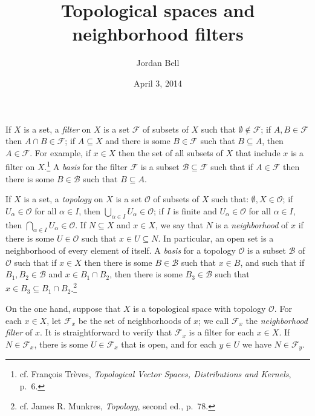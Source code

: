 \documentclass{article}
\begin{document}
\title{Topological spaces and neighborhood filters}
\author{Jordan Bell}
\date{April 3, 2014}
\maketitle

If $X$ is a set, a {\em filter} on $X$ is a set $\mathcal{F}$ of subsets of $X$ such that $\emptyset \not \in \mathcal{F}$; if $A,B \in \mathcal{F}$ then $A \cap B \in \mathcal{F}$;
if $A \subseteq X$ and there is some $B \in \mathcal{F}$ such that $B \subseteq A$, then $A \in \mathcal{F}$. For example, if $x \in X$ then the set of all subsets of $X$ that include
$x$ is a filter on $X$.\footnote{cf. Fran{\c c}ois Tr\`eves, {\em Topological Vector Spaces, Distributions and Kernels}, p.~6.}
A {\em basis} for the filter $\mathcal{F}$ is a subset $\mathcal{B} \subseteq \mathcal{F}$ such that if $A \in \mathcal{F}$ then there is some $B \in \mathcal{B}$ such that
$B \subseteq A$.


If $X$ is a set, a {\em topology} on $X$ is a set $\mathcal{O}$ of subsets of $X$ such that: $\emptyset, X \in \mathcal{O}$; 
if $U_\alpha \in \mathcal{O}$ for all $\alpha \in I$, then $\bigcup_{\alpha \in I} U_\alpha \in \mathcal{O}$; if $I$ is finite and
$U_\alpha \in \mathcal{O}$ for all $\alpha \in I$, then $\bigcap_{\alpha \in I} U_\alpha \in \mathcal{O}$. If $N \subseteq X$ and $x \in X$, we say that
$N$ is a {\em neighborhood} of $x$ if there is some $U \in \mathcal{O}$ such that $x \in U \subseteq N$. In particular, an open set is a neighborhood of every element of itself.
A {\em basis} for a topology $\mathcal{O}$ is a subset $\mathcal{B}$ of $\mathcal{O}$ such that if $x \in X$ then there is some $B \in \mathcal{B}$ such that $x \in B$, and such that
if $B_1,B_2 \in \mathcal{B}$ and $x \in B_1 \cap B_2$, then there is some $B_3 \in \mathcal{B}$ such that $x \in B_3 \subseteq B_1 \cap B_2$.\footnote{cf.
James R. Munkres, {\em Topology}, second ed., p.~78.}

On the one hand,
suppose that $X$ is a topological space with topology $\mathcal{O}$. For each $x \in X$, let $\mathcal{F}_x$ be the set of neighborhoods of $x$; we call
$\mathcal{F}_x$ the {\em neighborhood filter} of $x$. It is straightforward to verify that
$\mathcal{F}_x$ is a filter for each $x \in X$. If $N \in \mathcal{F}_x$, there is some $U \in \mathcal{F}_x$ that is open, and for each $y \in U$ we have $N \in \mathcal{F}_y$. 
\end{document}
